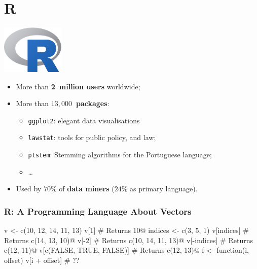 \documentclass{beamer}
\newcommand\emphb{\textbf}
\begin{document}
\section{R}

\begin{frame}
    \begin{center}
        \includegraphics[width=3cm]{images/Rlogo.png}
    \end{center}

    \vfill

    \begin{itemize}
        \item More than \emphb{2~million users} worldwide;
        \item More than \emphb{\(13,000\)~packages}:
            \begin{itemize}
                \item \texttt{ggplot2}: elegant data visualisations
                \item \texttt{lawstat}: tools for public policy, and law;
                \item \texttt{ptstem}: Stemming algorithms for the Portuguese language;
                \item …
            \end{itemize}
        \item Used by \(70\%\) of \emphb{data miners} (\(24\%\) as primary language).
    \end{itemize}
\end{frame}

\begin{frame}[fragile]
    \frametitle{R: A Programming Language About Vectors}

\begin{Rcode}
v <- c(10, 12, 14, 11, 13)
v[1]                         # Returns 10@\pause@
indices <- c(3, 5, 1)
v[indices]                   # Returns c(14, 13, 10)@\pause@
v[-2]                        # Returns c(10, 14, 11, 13)@\pause@
v[-indices]                  # Returns c(12, 11)@\pause@
v[c(FALSE, TRUE, FALSE)]     # Returns c(12, 13)@\pause@
f <- function(i, offset)
       v[i + offset]         # ??
\end{Rcode}

\end{frame}
\end{document}
